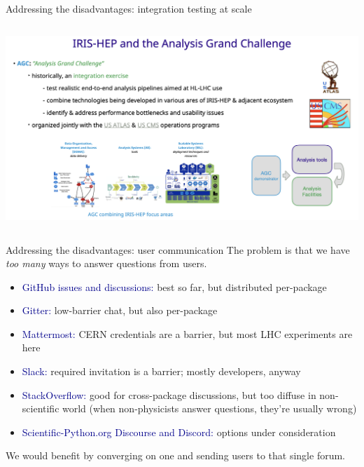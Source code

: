 \documentclass[aspectratio=169]{beamer}
\begin{document}
\begin{frame}{Addressing the disadvantages: integration testing at scale}
\vspace{0.4 cm}
\begin{columns}
\includegraphics[width=\linewidth]{PLOTS/agc-slide.png}
\end{columns}
\end{frame}

\begin{frame}{Addressing the disadvantages: user communication}
\vspace{0.25 cm}
The problem is that we have {\it too many} ways to answer questions from users.

\vspace{0.25 cm}
\begin{itemize}
\item \textcolor{darkblue}{GitHub issues and discussions:} best so far, but distributed per-package
\item \textcolor{darkblue}{Gitter:} low-barrier chat, but also per-package
\item \textcolor{darkblue}{Mattermost:} CERN credentials are a barrier, but most LHC experiments are here
\item \textcolor{darkblue}{Slack:} required invitation is a barrier; mostly developers, anyway
\item \textcolor{darkblue}{StackOverflow:} good for cross-package discussions, but too diffuse in non-scientific world (when non-physicists answer questions, they're usually wrong)
\item \textcolor{darkblue}{Scientific-Python.org Discourse and Discord:} options under consideration
\end{itemize}

\vspace{0.5 cm}
We would benefit by converging on one and sending users to that single forum.
\end{frame}
\end{document}
